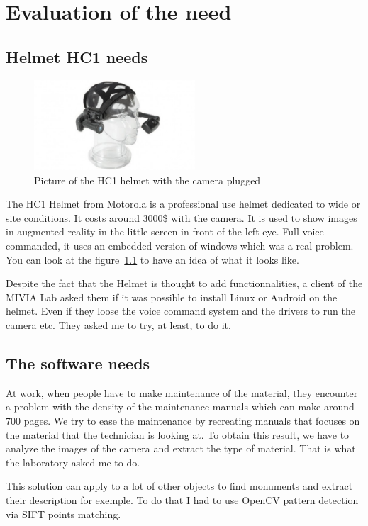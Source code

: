 \chapter{Evaluation of the need}

\section{Helmet HC1 needs}
\begin{figure}
 \begin{center}
	 \includegraphics[width=6cm]{images_not_compressed/motorola_hc1.jpg}
		\caption{Picture of the HC1 helmet with the camera plugged}
		\label{hc1}
	 \end{center}
 \end{figure}

 \par The HC1 Helmet from Motorola is a professional use helmet dedicated to wide or site conditions. It costs around 3000\$ with the camera. It is used to show images in augmented reality in the little screen in front of the left eye. Full voice commanded, it uses an embedded version of windows which was a real problem. You can look at the figure~\ref{hc1} to have an idea of what it looks like.
 
 \par Despite the fact that the Helmet is thought to add functionnalities, a client of the MIVIA Lab asked them if it was possible to install Linux or Android on the helmet. Even if they loose the voice command system and the drivers to run the camera etc. They asked me to try, at least, to do it.

\section{The software needs}
 \par At work, when people have to make maintenance of the material, they encounter a problem with the density of the maintenance manuals which can make around 700 pages. We try to ease the maintenance by recreating manuals that focuses on the material that the technician is looking at. To obtain this result, we have to analyze the images of the camera and extract the type of material. That is what the laboratory asked me to do.
 \par This solution can apply to a lot of other objects to find monuments and extract their description for exemple. To do that I had to use OpenCV pattern detection via SIFT points matching.  
	